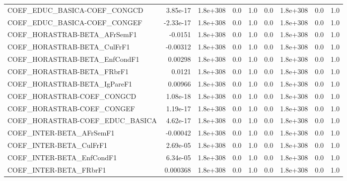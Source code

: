 \begin{tabular}{lrrrrrrrr}
COEF\_EDUC\_BASICA-COEF\_CONGCD         &    3.85e-17 &     1.8e+308 &     0.0 &      1.0 &        0.0 &    1.8e+308 &          0.0 &           1.0 \\
COEF\_EDUC\_BASICA-COEF\_CONGEF         &   -2.33e-17 &     1.8e+308 &     0.0 &      1.0 &        0.0 &    1.8e+308 &          0.0 &           1.0 \\
COEF\_HORASTRAB-BETA\_AFrSemF1         &     -0.0151 &     1.8e+308 &     0.0 &      1.0 &        0.0 &    1.8e+308 &          0.0 &           1.0 \\
COEF\_HORASTRAB-BETA\_CulFrF1          &    -0.00312 &     1.8e+308 &     0.0 &      1.0 &        0.0 &    1.8e+308 &          0.0 &           1.0 \\
COEF\_HORASTRAB-BETA\_EnfCondF1        &     0.00298 &     1.8e+308 &     0.0 &      1.0 &        0.0 &    1.8e+308 &          0.0 &           1.0 \\
COEF\_HORASTRAB-BETA\_FRbrF1           &      0.0121 &     1.8e+308 &     0.0 &      1.0 &        0.0 &    1.8e+308 &          0.0 &           1.0 \\
COEF\_HORASTRAB-BETA\_IgPareF1         &     0.00966 &     1.8e+308 &     0.0 &      1.0 &        0.0 &    1.8e+308 &          0.0 &           1.0 \\
COEF\_HORASTRAB-COEF\_CONGCD           &    1.08e-18 &     1.8e+308 &     0.0 &      1.0 &        0.0 &    1.8e+308 &          0.0 &           1.0 \\
COEF\_HORASTRAB-COEF\_CONGEF           &    1.19e-17 &     1.8e+308 &     0.0 &      1.0 &        0.0 &    1.8e+308 &          0.0 &           1.0 \\
COEF\_HORASTRAB-COEF\_EDUC\_BASICA      &    4.62e-17 &     1.8e+308 &     0.0 &      1.0 &        0.0 &    1.8e+308 &          0.0 &           1.0 \\
COEF\_INTER-BETA\_AFrSemF1             &    -0.00042 &     1.8e+308 &     0.0 &      1.0 &        0.0 &    1.8e+308 &          0.0 &           1.0 \\
COEF\_INTER-BETA\_CulFrF1              &    2.69e-05 &     1.8e+308 &     0.0 &      1.0 &        0.0 &    1.8e+308 &          0.0 &           1.0 \\
COEF\_INTER-BETA\_EnfCondF1            &    6.34e-05 &     1.8e+308 &     0.0 &      1.0 &        0.0 &    1.8e+308 &          0.0 &           1.0 \\
COEF\_INTER-BETA\_FRbrF1               &    0.000368 &     1.8e+308 &     0.0 &      1.0 &        0.0 &    1.8e+308 &          0.0 &           1.0 \\

\end{tabular}
